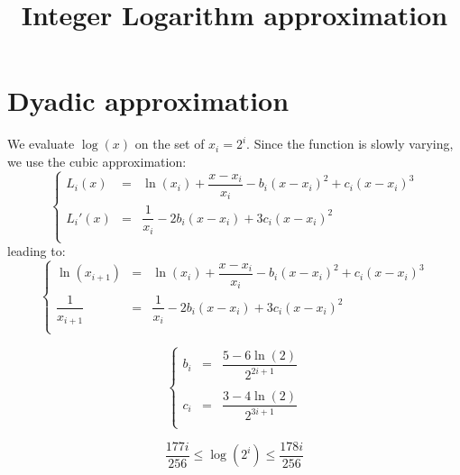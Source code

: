 \documentclass[aps]{revtex4}
\begin{document}
\title{Integer Logarithm approximation}
\maketitle

\section{Dyadic approximation}
We evaluate $\log(x)$ on the set of $x_i=2^i$.
Since the function is slowly varying, we use the cubic approximation:
\begin{equation}
\left\lbrace
\begin{array}{rcl}
	L_i(x)  & = & \ln(x_i) + \dfrac{x-x_i}{x_i} - b_i \left(x-x_i\right)^2 + c_i \left(x-x_i\right)^3\\
	L_i'(x) & = & \dfrac{1}{x_i} - 2b_i \left(x-x_i\right) + 3 c_i  \left(x-x_i\right)^2 \\
\end{array}
\right.
\end{equation}
leading to:
\begin{equation}
\left\lbrace
\begin{array}{rcl}
	\ln(x_{i+1})       & = & \ln(x_i) + \dfrac{x-x_i}{x_i} - b_i \left(x-x_i\right)^2 + c_i \left(x-x_i\right)^3\\
	\dfrac{1}{x_{i+1}} & = & \dfrac{1}{x_i} - 2b_i \left(x-x_i\right) + 3 c_i  \left(x-x_i\right)^2 \\
\end{array}
\right.
\end{equation}

\begin{equation}
\left\lbrace
\begin{array}{rcl}
b_i  & = & \dfrac{5-6\ln(2)}{2^{2i+1}}\\
\\
c_ i & = & \dfrac{3-4\ln(2)}{2^{3i+1}}\\
\end{array}
\right.
\end{equation}

\begin{equation}
	\dfrac{177 i}{256} \leq \log\left(2^i\right) \leq \dfrac{178 i}{256}
\end{equation}
\end{document}
